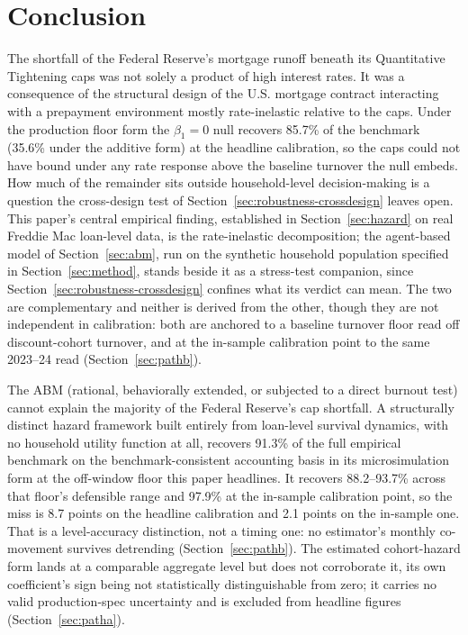 \documentclass[12pt]{article}
\begin{document}
\section{Conclusion}\label{sec:conclusion}

The shortfall of the Federal Reserve's mortgage runoff beneath its Quantitative Tightening caps was not solely a product of high interest rates. It was a consequence of the structural design of the U.S. mortgage contract interacting with a prepayment environment mostly rate-inelastic relative to the caps. Under the production floor form the $\beta_1 = 0$ null recovers 85.7\% of the benchmark (35.6\% under the additive form) at the headline calibration, so the caps could not have bound under any rate response above the baseline turnover the null embeds. How much of the remainder sits outside household-level decision-making is a question the cross-design test of Section~\ref{sec:robustness-crossdesign} leaves open. This paper's central empirical finding, established in Section~\ref{sec:hazard} on real Freddie Mac loan-level data, is the rate-inelastic decomposition; the agent-based model of Section~\ref{sec:abm}, run on the synthetic household population specified in Section~\ref{sec:method}, stands beside it as a stress-test companion, since Section~\ref{sec:robustness-crossdesign} confines what its verdict can mean. The two are complementary and neither is derived from the other, though they are not independent in calibration: both are anchored to a baseline turnover floor read off discount-cohort turnover, and at the in-sample calibration point to the same 2023--24 read (Section~\ref{sec:pathb}).

The ABM (rational, behaviorally extended, or subjected to a direct burnout test) cannot explain the majority of the Federal Reserve's cap shortfall. A structurally distinct hazard framework built entirely from loan-level survival dynamics, with no household utility function at all, recovers 91.3\% of the full empirical benchmark on the benchmark-consistent accounting basis in its microsimulation form at the off-window floor this paper headlines. It recovers 88.2--93.7\% across that floor's defensible range and 97.9\% at the in-sample calibration point, so the miss is 8.7 points on the headline calibration and 2.1 points on the in-sample one. That is a level-accuracy distinction, not a timing one: no estimator's monthly co-movement survives detrending (Section~\ref{sec:pathb}). The estimated cohort-hazard form lands at a comparable aggregate level but does not corroborate it, its own coefficient's sign being not statistically distinguishable from zero; it carries no valid production-spec uncertainty and is excluded from headline figures (Section~\ref{sec:patha}).
\end{document}
